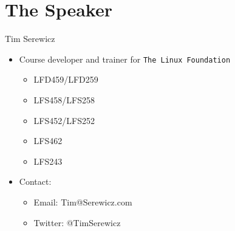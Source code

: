 \section{The Speaker}

\begin{frame}
   {Tim Serewicz}

   \begin{itemize}
      \item Course developer and trainer for \verb:The Linux Foundation:
      \begin{itemize}
	      \item LFD459/LFD259
      \item LFS458/LFS258
      \item LFS452/LFS252
      \item LFS462
      \item LFS243
   \end{itemize}
      \item Contact:
	      \begin{itemize}
      \item Email: Tim@Serewicz.com
      \item Twitter: @TimSerewicz
	      \end{itemize}
   \end{itemize}

\end{frame}

\cprotect\note{

}
